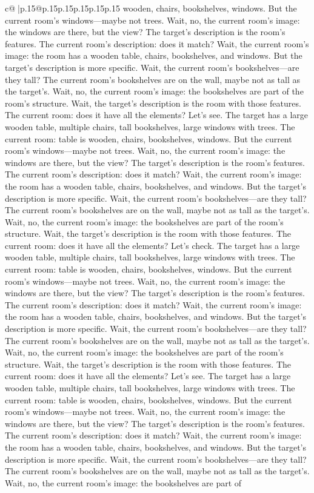 \documentclass{article}
\begin{document}
{\begin{supertabular}{c@{$\;$}|p{.15\linewidth}@{}p{.15\linewidth}p{.15\linewidth}p{.15\linewidth}p{.15\linewidth}p{.15\linewidth}}
{{{wooden, chairs, bookshelves, windows. But the current room's windows—maybe not trees. Wait, no, the current room's image: the windows are there, but the view? The target's description is the room's features. The current room's description: does it match? Wait, the current room's image: the room has a wooden table, chairs, bookshelves, and windows. But the target's description is more specific. Wait, the current room's bookshelves—are they tall? The current room's bookshelves are on the wall, maybe not as tall as the target's. Wait, no, the current room's image: the bookshelves are part of the room's structure. Wait, the target's description is the room with those features. The current room: does it have all the elements? Let's see. The target has a large wooden table, multiple chairs, tall bookshelves, large windows with trees. The current room: table is wooden, chairs, bookshelves, windows. But the current room's windows—maybe not trees. Wait, no, the current room's image: the windows are there, but the view? The target's description is the room's features. The current room's description: does it match? Wait, the current room's image: the room has a wooden table, chairs, bookshelves, and windows. But the target's description is more specific. Wait, the current room's bookshelves—are they tall? The current room's bookshelves are on the wall, maybe not as tall as the target's. Wait, no, the current room's image: the bookshelves are part of the room's structure. Wait, the target's description is the room with those features. The current room: does it have all the elements? Let's check. The target has a large wooden table, multiple chairs, tall bookshelves, large windows with trees. The current room: table is wooden, chairs, bookshelves, windows. But the current room's windows—maybe not trees. Wait, no, the current room's image: the windows are there, but the view? The target's description is the room's features. The current room's description: does it match? Wait, the current room's image: the room has a wooden table, chairs, bookshelves, and windows. But the target's description is more specific. Wait, the current room's bookshelves—are they tall? The current room's bookshelves are on the wall, maybe not as tall as the target's. Wait, no, the current room's image: the bookshelves are part of the room's structure. Wait, the target's description is the room with those features. The current room: does it have all the elements? Let's see. The target has a large wooden table, multiple chairs, tall bookshelves, large windows with trees. The current room: table is wooden, chairs, bookshelves, windows. But the current room's windows—maybe not trees. Wait, no, the current room's image: the windows are there, but the view? The target's description is the room's features. The current room's description: does it match? Wait, the current room's image: the room has a wooden table, chairs, bookshelves, and windows. But the target's description is more specific. Wait, the current room's bookshelves—are they tall? The current room's bookshelves are on the wall, maybe not as tall as the target's. Wait, no, the current room's image: the bookshelves are part of }}}
\end{supertabular}}
\end{document}
